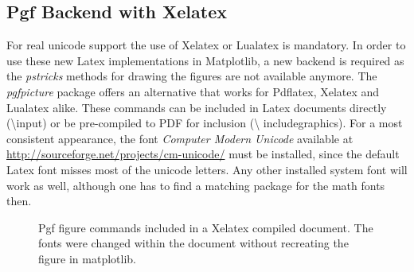 \documentclass[12pt, a4paper]{article}
\begin{document}
\newpage
\subsection*{Pgf Backend with Xelatex}

For real unicode support the use of Xelatex or Lualatex is mandatory. In order to use these new Latex implementations in Matplotlib, a new backend is required as the \textit{pstricks} methods for drawing the figures are not available anymore. The \textit{pgfpicture} package offers an alternative that works for Pdflatex, Xelatex and Lualatex alike. These commands can be included in Latex documents directly (\textbackslash input) or be pre-compiled to PDF for inclusion (\textbackslash
 includegraphics). For a most consistent appearance, the font \textit{Computer Modern Unicode} available at \url{http://sourceforge.net/projects/cm-unicode/} must be installed, since the default Latex font misses most of the unicode letters. Any other installed system font will work as well, although one has to find a matching package for the math fonts then.

\begin{figure}[h]
\hspace{1mm}
\caption{Pgf figure commands included in a Xelatex compiled document. The fonts were changed within the document without recreating the figure in matplotlib.}
\end{figure}
\end{document}
